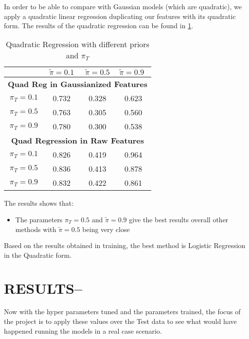 \documentclass[12pt, twocolumn]{article}
\begin{document}
 In order to be able to compare with Gaussian models (which are quadratic), we apply a quadratic linear regression duplicating our features with its quadratic form. The results of the quadratic regression can be found in \ref{tab:quadratic-regression}. 
\begin{table}[H]
\caption{\label{tab:quadratic-regression} Quadratic Regression with different priors and $\pi_T$}

\begin{center}
\begin{tabular}{cccc}
\hline
\multicolumn{1}{l}{} & \textbf{$\tilde{\pi } = 0.1$} & \textbf{$\tilde{\pi } = 0.5$} & \multicolumn{1}{l}{\textbf{$\tilde{\pi}  = 0.9$}} \\ \hline
\multicolumn{4}{c}{\textbf{Quad Reg in Gaussianized Features}} \\ \hline
\multicolumn{1}{c|}{$\pi_T = 0.1$}   & 0.732  & 0.328  & 0.623  \\
\multicolumn{1}{c|}{$\pi_T = 0.5$}   & 0.763  & 0.305  & 0.560  \\
\multicolumn{1}{c|}{$\pi_T = 0.9$}   & 0.780  & 0.300  & 0.538  \\ \hline
\multicolumn{4}{c}{\textbf{Quad Regression in Raw Features}}          \\ \hline
\multicolumn{1}{c|}{$\pi_T = 0.1$}   & 0.826  & 0.419  & 0.964  \\
\multicolumn{1}{c|}{$\pi_T = 0.5$}   & 0.836  & 0.413  & 0.878  \\
\multicolumn{1}{c|}{$\pi_T = 0.9$}   & 0.832  & 0.422  & 0.861  \\ \hline
\end{tabular}
\end{center}
\end{table}

The results shows that:
 \begin{itemize}
     \item The parameters $\pi_T=0.5$ and $\tilde{\pi}=0.9$ give the best results overall
     other methods with $\tilde{\pi}=0.5$ being very close 
 \end{itemize}
  
Based on the results obtained in training, the best method is Logistic Regression in the Quadratic form.
  
\section{RESULTS--} 
Now with the hyper parameters tuned and the parameters trained, the focus of the project
is to apply these values over the Test data to see what would have happened running the models in a real case scenario.
\end{document}
